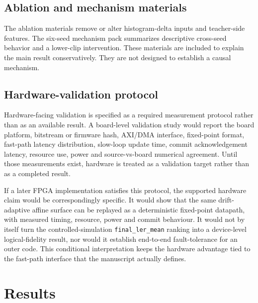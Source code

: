 \documentclass[11pt]{article}
\newcommand{\finalLER}{\texttt{final\_ler\_mean}}
\begin{document}
\subsection{Ablation and mechanism materials}

The ablation materials remove or alter histogram-delta inputs and teacher-side
features.  The six-seed mechanism pack summarizes descriptive cross-seed
behavior and a lower-clip intervention.  These materials are included to
explain the main result conservatively.  They are not designed to establish
a causal mechanism.

\subsection{Hardware-validation protocol}

Hardware-facing validation is specified as a required measurement protocol
rather than as an available result.  A board-level validation study would report
the board platform, bitstream or firmware hash, AXI/DMA interface, fixed-point
format, fast-path latency distribution, slow-loop update time, commit
acknowledgement latency, resource use, power and source-vs-board numerical
agreement.  Until those measurements exist, hardware is treated as a validation
target rather than as a completed result.

If a later FPGA implementation satisfies this protocol, the supported hardware
claim would be correspondingly specific.  It would show that the same
drift-adaptive affine surface can be replayed as a deterministic fixed-point
datapath, with measured timing, resource, power and commit behaviour.  It would
not by itself turn the controlled-simulation \finalLER{} ranking into a
device-level logical-fidelity result, nor would it establish end-to-end
fault-tolerance for an outer code.  This conditional interpretation keeps the
hardware advantage tied to the fast-path interface that the manuscript actually
defines.

\section{Results}
\end{document}
